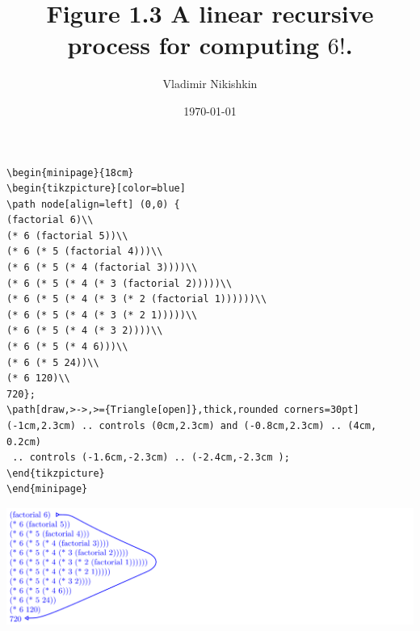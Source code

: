 \documentclass[a4paper,12pt,twoside]{report}
\author{Vladimir Nikishkin}
\date{\today}
\title{Figure 1.3 A linear recursive process for computing \(6!\).}
\begin{document}
\maketitle
\tableofcontents

\lstset{numbers=left,frame=single,language=[LaTeX]TeX,label=org47a7ea4,caption= ,captionpos=b}
\begin{lstlisting}
\begin{minipage}{18cm}
\begin{tikzpicture}[color=blue]
\path node[align=left] (0,0) {
(factorial 6)\\
(* 6 (factorial 5))\\
(* 6 (* 5 (factorial 4)))\\
(* 6 (* 5 (* 4 (factorial 3))))\\
(* 6 (* 5 (* 4 (* 3 (factorial 2)))))\\
(* 6 (* 5 (* 4 (* 3 (* 2 (factorial 1))))))\\
(* 6 (* 5 (* 4 (* 3 (* 2 1)))))\\
(* 6 (* 5 (* 4 (* 3 2))))\\
(* 6 (* 5 (* 4 6)))\\
(* 6 (* 5 24))\\
(* 6 120)\\
720};
\path[draw,>->,>={Triangle[open]},thick,rounded corners=30pt] 
(-1cm,2.3cm) .. controls (0cm,2.3cm) and (-0.8cm,2.3cm) .. (4cm, 0.2cm)
 .. controls (-1.6cm,-2.3cm) .. (-2.4cm,-2.3cm );
\end{tikzpicture}
\end{minipage}
\end{lstlisting}

\begin{center}
\includegraphics[width=.9\linewidth]{figure-1-3-factorial.png}
\end{center}
\end{document}
